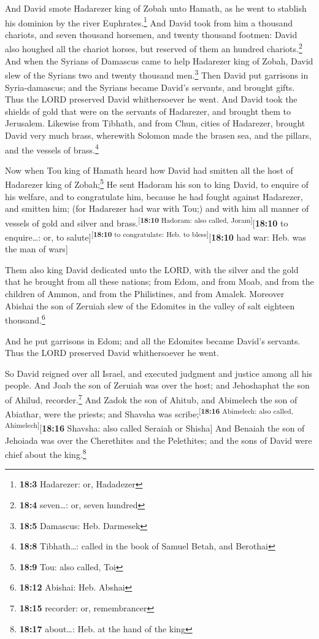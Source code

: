  And David smote Hadarezer king of Zobah unto Hamath, as
he went to stablish his dominion by the river Euphrates.\footnote{\textbf{18:3}
  Hadarezer: or, Hadadezer}  And David took from him a
thousand chariots, and seven thousand horsemen, and twenty thousand
footmen: David also houghed all the chariot horses, but reserved of them
an hundred chariots.\footnote{\textbf{18:4} seven\ldots: or, seven
  hundred}  And when the Syrians of Damascus came to help
Hadarezer king of Zobah, David slew of the Syrians two and twenty
thousand men.\footnote{\textbf{18:5} Damascus: Heb. Darmesek}
 Then David put garrisons in Syria-damascus; and the
Syrians became David's servants, and brought gifts. Thus the LORD
preserved David whithersoever he went.  And David took the
shields of gold that were on the servants of Hadarezer, and brought them
to Jerusalem.  Likewise from Tibhath, and from Chun,
cities of Hadarezer, brought David very much brass, wherewith Solomon
made the brasen sea, and the pillars, and the vessels of
brass.\footnote{\textbf{18:8} Tibhath\ldots: called in the book of
  Samuel Betah, and Berothai}

 Now when Tou king of Hamath heard how David had smitten
all the host of Hadarezer king of Zobah;\footnote{\textbf{18:9} Tou:
  also called, Toi}  He sent Hadoram his son to king
David, to enquire of his welfare, and to congratulate him, because he
had fought against Hadarezer, and smitten him; (for Hadarezer had war
with Tou;) and with him all manner of vessels of gold and silver and
brass.\textsuperscript{{[}\textbf{18:10} Hadoram: also called,
Joram{]}}{[}\textbf{18:10} to enquire\ldots: or, to
salute{]}\textsuperscript{{[}\textbf{18:10} to congratulate: Heb. to
bless{]}}{[}\textbf{18:10} had war: Heb. was the man of wars{]}

 Them also king David dedicated unto the LORD, with the
silver and the gold that he brought from all these nations; from Edom,
and from Moab, and from the children of Ammon, and from the Philistines,
and from Amalek.  Moreover Abishai the son of Zeruiah
slew of the Edomites in the valley of salt eighteen thousand.\footnote{\textbf{18:12}
  Abishai: Heb. Abshai}

 And he put garrisons in Edom; and all the Edomites
became David's servants. Thus the LORD preserved David whithersoever he
went.

 So David reigned over all Israel, and executed judgment
and justice among all his people.  And Joab the son of
Zeruiah was over the host; and Jehoshaphat the son of Ahilud,
recorder.\footnote{\textbf{18:15} recorder: or, remembrancer}
 And Zadok the son of Ahitub, and Abimelech the son of
Abiathar, were the priests; and Shavsha was
scribe;\textsuperscript{{[}\textbf{18:16} Abimelech: also called,
Ahimelech{]}}{[}\textbf{18:16} Shavsha: also called Seraiah or Shisha{]}
 And Benaiah the son of Jehoiada was over the Cherethites
and the Pelethites; and the sons of David were chief about the
king.\footnote{\textbf{18:17} about\ldots: Heb. at the hand of the king}

